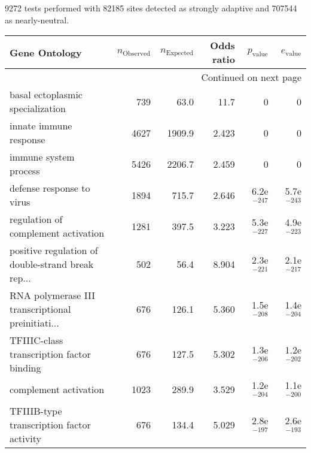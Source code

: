 9272 tests performed with 82185 sites detected as strongly adaptive and 707544 as nearly-neutral.
\scriptsize
\begin{longtable}{lrrrrr}
\toprule
                                     Gene Ontology & $n_{\mathrm{Observed}}$ & $n_{\mathrm{Expected}}$ & Odds ratio & $p_{\mathrm{value}}$ & $e_{\mathrm{value}}$ \\
\midrule
\endhead
\midrule
\multicolumn{6}{r}{{Continued on next page}} \\
\midrule
\endfoot

\bottomrule
\endlastfoot
                  basal ectoplasmic specialization &                     739 &                    63.0 &       11.7 &                    0 &                    0 \\
                            innate immune response &                    4627 &                  1909.9 &      2.423 &                    0 &                    0 \\
                             immune system process &                    5426 &                  2206.7 &      2.459 &                    0 &                    0 \\
                         defense response to virus &                    1894 &                   715.7 &      2.646 &        6.2e$^{-247}$ &        5.7e$^{-243}$ \\
               regulation of complement activation &                    1281 &                   397.5 &      3.223 &        5.3e$^{-227}$ &        4.9e$^{-223}$ \\
 positive regulation of double-strand break rep... &                     502 &                    56.4 &      8.904 &        2.3e$^{-221}$ &        2.1e$^{-217}$ \\
 RNA polymerase III transcriptional preinitiati... &                     676 &                   126.1 &      5.360 &        1.5e$^{-208}$ &        1.4e$^{-204}$ \\
         TFIIIC-class transcription factor binding &                     676 &                   127.5 &      5.302 &        1.3e$^{-206}$ &        1.2e$^{-202}$ \\
                             complement activation &                    1023 &                   289.9 &      3.529 &        1.2e$^{-204}$ &        1.1e$^{-200}$ \\
         TFIIIB-type transcription factor activity &                     676 &                   134.4 &      5.029 &        2.8e$^{-197}$ &        2.6e$^{-193}$ \\

\end{longtable}
